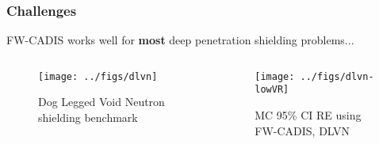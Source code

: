 \documentclass[xcolor=x11names,compress]{beamer}
\renewcommand{\(}{\begin{columns}}
\renewcommand{\)}{\end{columns}}
\newcommand{\<}[1]{\begin{column}{#1}}
\renewcommand{\>}{\end{column}}
\begin{document}
\begin{frame}[fragile]
  \frametitle{Challenges}

	FW-CADIS works well for \textbf{most} deep penetration
	shielding problems...
	\begin{columns}
  	\begin{column}{0.5\textwidth}
  	\begin{figure}
  	\begin{center}
  		\texttt{[image: ../figs/dlvn]}
		\caption{Dog Legged Void Neutron shielding benchmark}
	\end{center}
  	\end{figure}
  	\end{column}
 	\begin{column}{0.5\textwidth}
 	\begin{figure}
  	\begin{center}
  		\texttt{[image: ../figs/dlvn-lowVR]}
  		\caption{MC 95\% CI RE using FW-CADIS, DLVN \cite{Slaybaugh2013}}
  	\end{center}
  	\end{figure}
  	\end{column}
	\end{columns}
  
\end{frame}
\end{document}
